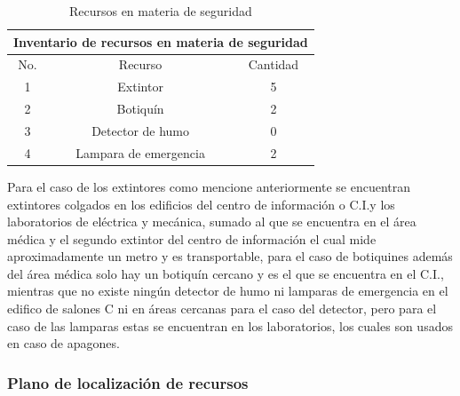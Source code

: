 \begin{table}[H]
    \centering
    \caption{Recursos en materia de seguridad}
    \begin{tabular}{c c c}
    \hline
    \multicolumn{3}{c}{Inventario de recursos en materia de seguridad}\\
    \hline
         No.& Recurso & Cantidad  \\
    \hline
         1& Extintor & 5  \\
    \hline
         2& Botiquín & 2  \\
    \hline
         3& Detector de humo &  0\\
    \hline
         4& Lampara de emergencia &  2\\
    \hline     
    \end{tabular}
    \label{tab:inventario}
\end{table}

Para el caso de los extintores como mencione anteriormente se encuentran extintores colgados en los edificios del centro de información o C.I.y los laboratorios de eléctrica y mecánica, sumado al que se encuentra en el área médica y el segundo extintor del centro de información el cual mide aproximadamente un metro y es transportable, para el caso de botiquines además del área médica solo hay un botiquín cercano y es el que se encuentra en el C.I., mientras que no existe ningún detector de humo ni lamparas de emergencia en el edifico de salones C ni en áreas cercanas para el caso del detector, pero para el caso de las lamparas estas se encuentran en los laboratorios, los cuales son usados en caso de apagones.

\subsubsection{Plano de localización de recursos}


